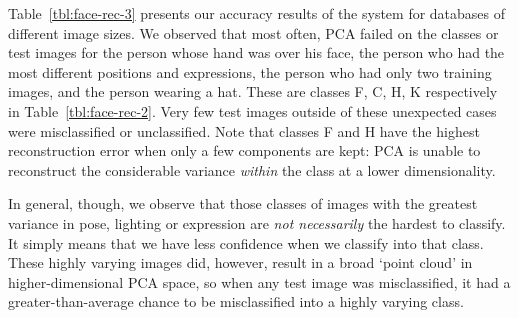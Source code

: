 Table~\ref{tbl:face-rec-3} presents our accuracy results of the system for databases of different image sizes. We observed that most often, PCA failed on the classes or test images for the person whose hand was over his face, the person who had the most different positions and expressions, the person who had only two training images, and the person wearing a hat. These are classes F, C, H, K respectively in Table~\ref{tbl:face-rec-2}. Very few test images outside of these unexpected cases were misclassified or unclassified. Note that classes F and H have the highest reconstruction error when only a few components are kept: PCA is unable to reconstruct the considerable variance \emph{within} the class at a lower dimensionality.

In general, though, we observe that those classes of images with the greatest variance in pose, lighting or expression are \emph{not necessarily} the hardest to classify. It simply means that we have less confidence when we classify into that class. These highly varying images did, however, result in a broad `point cloud' in higher-dimensional PCA space, so when any test image was misclassified, it had a greater-than-average chance to be misclassified into a highly varying class.

